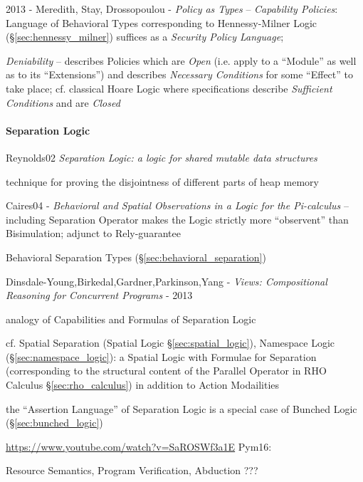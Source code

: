 \asterism

2013 - Meredith, Stay, Drossopoulou - \emph{Policy as Types} --
\emph{Capability Policies}: Language of Behavioral Types corresponding to
Hennessy-Milner Logic (\S\ref{sec:hennessy_milner}) suffices as a \emph{Security
  Policy Language};

\emph{Deniability} --
describes Policies which are \emph{Open} (i.e. apply to a ``Module'' as well as
to its ``Extensions'') and describes \emph{Necessary Conditions} for some
``Effect'' to take place; cf. classical Hoare Logic where
specifications describe \emph{Sufficient Conditions} and are
  \emph{Closed}



\paragraph{Separation Logic}\label{sec:separation_logic}\hfill

Reynolds02 \emph{Separation Logic: a logic for shared mutable data
  structures}

technique for proving the disjointness of different parts of heap memory

Caires04 - \emph{Behavioral and Spatial Observations in a Logic for the
  Pi-calculus} -- including Separation Operator makes the Logic strictly more
``observent'' than Bisimulation; adjunct to Rely-guarantee

\fist Behavioral Separation Types (\S\ref{sec:behavioral_separation})

Dinsdale-Young,Birkedal,Gardner,Parkinson,Yang - \emph{Views: Compositional
Reasoning for Concurrent Programs} - 2013

analogy of Capabilities and Formulas of Separation Logic

cf. Spatial Separation (Spatial Logic \S\ref{sec:spatial_logic}), Namespace
Logic (\S\ref{sec:namespace_logic}): a Spatial Logic with Formulae for
Separation (corresponding to the structural content of the Parallel Operator in
RHO Calculus \S\ref{sec:rho_calculus}) in addition to Action Modailities

the ``Assertion Language'' of Separation Logic is a special case of
Bunched Logic (\S\ref{sec:bunched_logic})


\url{https://www.youtube.com/watch?v=SaROSWf3a1E} Pym16:

Resource Semantics, Program Verification, Abduction ???


